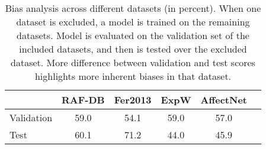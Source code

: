 \begin{table}[b] 
\caption{Bias analysis across different datasets (in percent). When one dataset is excluded, a model is trained on the remaining datasets. Model is evaluated on the validation set of the included datasets, and then is tested over the excluded dataset. More difference between validation and test scores highlights more inherent biases in that dataset.}
\label{tbl:leave_one_dataset_out_accuracy}
\centering
\small
\resizebox{0.37\textwidth}{!}
{{
\begin{tabular}{l|ccccc}
              & RAF-DB & Fer2013 & ExpW & AffectNet \\ \hline
Validation  & 59.0 & 54.1 & 59.0 & 57.0\\
Test        & 60.1 & 71.2 & 44.0 & 45.9 

\end{tabular}
}}
\end{table}